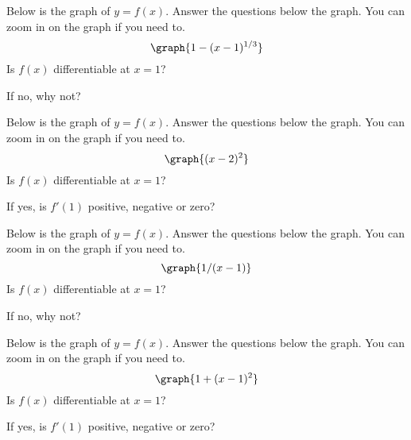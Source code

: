 \documentclass[handout]{ximera}
\begin{document}
\begin{problem}
Below is the graph of $y = f(x)$.  Answer the questions below the graph.  You can zoom in on the graph if you need to.
\[
\graph{1 - (x-1)^{1/3}}
\]
Is $f(x)$ differentiable at $x = 1$?
\begin{multipleChoice}
\end{multipleChoice}
If no, why not?
\begin{multipleChoice}
\end{multipleChoice}
\end{problem}



\begin{problem}
Below is the graph of $y = f(x)$.  Answer the questions below the graph.  You can zoom in on the graph if you need to.
\[
\graph{(x-2)^2}
\]
Is $f(x)$ differentiable at $x = 1$?
\begin{multipleChoice}
\end{multipleChoice}
If yes, is $f'(1)$ positive, negative or zero?
\begin{multipleChoice}
\end{multipleChoice}
\end{problem}


\begin{problem}
Below is the graph of $y = f(x)$.  Answer the questions below the graph.  You can zoom in on the graph if you need to.
\[
\graph{1/(x-1)}
\]
Is $f(x)$ differentiable at $x = 1$?
\begin{multipleChoice}
\end{multipleChoice}
If no, why not?
\begin{multipleChoice}
\end{multipleChoice}
\end{problem}



\begin{problem}
Below is the graph of $y = f(x)$.  Answer the questions below the graph.  You can zoom in on the graph if you need to.
\[
\graph{1 + (x-1)^2}
\]
Is $f(x)$ differentiable at $x = 1$?
\begin{multipleChoice}
\end{multipleChoice}
If yes, is $f'(1)$ positive, negative or zero?
\begin{multipleChoice}
\end{multipleChoice}
\end{problem}
\end{document}
